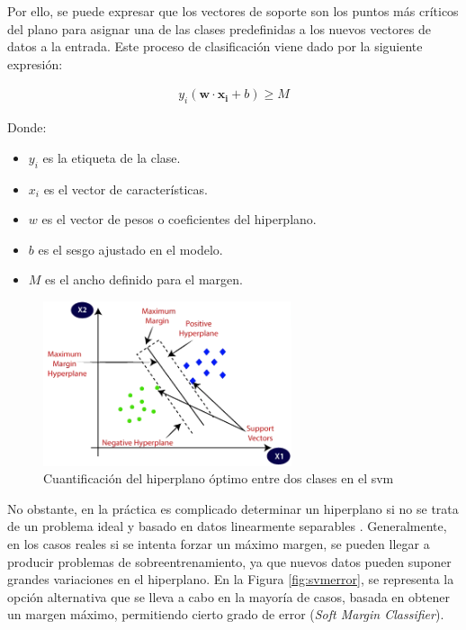 \vspace{3mm}

Por ello, se puede expresar que los vectores de soporte son los puntos más críticos del plano para asignar una de las clases predefinidas a los nuevos vectores de datos a la entrada. Este proceso de clasificación viene dado por la siguiente expresión: \cite{svmmedium} 

\begin{equation}
    \begin{aligned}
        y_i(\mathbf{w} \cdot \mathbf{x_i} + b) \geq M
    \end{aligned}
\end{equation} 

    Donde:
\begin{itemize}
    \renewcommand{\labelitemi}{}
    \item \(y_i\) es la etiqueta de la clase. 
    \item \(x_i\) es el vector de características.
    \item \(w\) es el vector de pesos o coeficientes del hiperplano.
    \item \(b\) es el sesgo ajustado en el modelo.
    \item \(M\) es el ancho definido para el margen.
\end{itemize}

\vspace{3mm}

\begin{figure}[h!]
    \centering
    \includegraphics[width=0.65\textwidth]{img/teoria/svm.png}
    \caption{Cuantificación del hiperplano óptimo entre dos clases en el \acrshort{svm} \cite{svmmedium2}}
    \label{fig:svm}
\end{figure}

\vspace{3mm}

No obstante, en la práctica es complicado determinar un hiperplano si no se trata de un problema ideal y basado en datos linearmente separables \cite{matlab} \cite{svmciencia}. Generalmente, en los casos reales si se intenta forzar un máximo margen, se pueden llegar a producir problemas de sobreentrenamiento, ya que nuevos datos pueden suponer grandes variaciones en el hiperplano. En la Figura \ref{fig:svmerror}, se representa la opción alternativa que se lleva a cabo en la mayoría de casos, basada en obtener un margen máximo, permitiendo cierto grado de error (\textit{Soft Margin Classifier}). 

